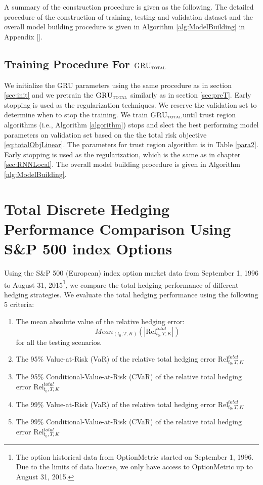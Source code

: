 \documentclass[letterpaper,12pt,titlepage,oneside,final]{book}
\numberwithin{equation}{section}
\theoremstyle{definition}
\newcommand{\modelT}{\textsc{GRU}_{\textsc{total}}}
\begin{document}
A summary of the construction procedure is given as the following. The detailed procedure of the construction of  training, testing and validation dataset and the overall model building procedure is given in Algorithm \ref{alg:ModelBuilding} in Appendix \ref{}.



\subsection{Training Procedure For $\modelT$}
\label{sec:TotalModelProcedure}
We  initialize the  GRU parameters using the same procedure as in section \ref{sec:init} and we pretrain the $\modelT$ similarly as in section \ref{sec:preT}. Early stopping is used as the regularization techniques. We reserve the validation set to determine when to stop the training. 
We train $\modelT$until trust region algorithms (i.e., Algorithm \ref{algorithm}) stops and slect the best performing model parameters on validation set based on  the the total risk objective \eqref{eq:totalObjLinear}. The  parameters for trust region algorithm is in Table \ref{para2}. Early stopping is used as the regularization, which is the same as in chapter \ref{sec:RNNLocal}. The overall model building procedure is given in Algorithm \ref{alg:ModelBuilding}.
\section{Total Discrete Hedging Performance Comparison Using  S\&P 500 index Options} \label{sec:totalcriteria}
Using the S\&P 500  ({European})  index option market data from September 1, 1996 to August 31, 2015\footnote{The option historical data from OptionMetric \cite{optionmetrics2008ivy} started on September 1, 1996. Due to the limits of data license, we only have access to OptionMetric up to  August 31, 2015.},
we  compare the total hedging performance of different hedging strategies.
We evaluate the total hedging performance using the following 5 criteria:
\begin{enumerate}
	\item The mean absolute value of the relative hedging error:
	\[
	Mean_{(t_0,T,K)}\left(\left|\text{Rel}^{total}_{t_0,T,K}\right|\right)
	\] for all the testing scenarios.
	\item The 95\% Value-at-Risk (VaR) of the relative total hedging error $\text{Rel}^{total}_{t_0,T,K}$
	\item The 95\% Conditional-Value-at-Risk (CVaR) of the relative total hedging error $\text{Rel}^{total}_{t_0,T,K}$
	\item The 99\% Value-at-Risk (VaR) of the relative total hedging error $\text{Rel}^{total}_{t_0,T,K}$
	\item The 99\% Conditional-Value-at-Risk (CVaR) of the relative total hedging error $\text{Rel}^{total}_{t_0,T,K}$
\end{enumerate}
\end{document}
